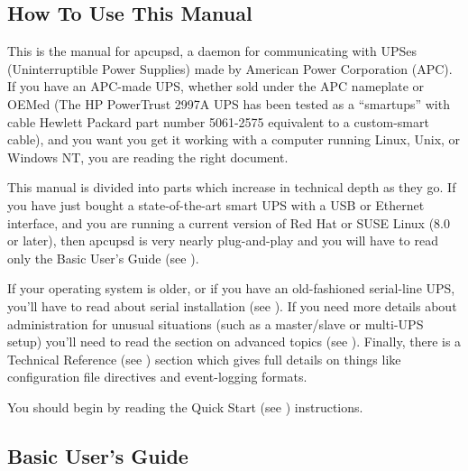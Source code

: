 \normalsize

\label{How-To-Use-This-Manual}

\subsection*{How To Use This Manual}

\label{index-Using-this-Manual-3}
This is the manual for apcupsd, a daemon for communicating with UPSes
(Uninterruptible Power Supplies) made by American Power Corporation (APC).  If
you have an APC-made UPS, whether sold under the APC nameplate or OEMed (The
HP PowerTrust 2997A UPS has been tested as a ``smartups'' with cable Hewlett
Packard part number 5061-2575 equivalent to a custom-smart cable), and you
want you get it working with a computer running Linux, Unix, or Windows NT,
you are reading the right document.  

This manual is divided into parts which increase in technical depth as they
go.  If you have just bought a state-of-the-art smart UPS with a USB or
Ethernet interface, and you are running a current version of Red Hat or SUSE
Linux (8.0 or later), then apcupsd is very nearly plug-and-play and you will
have to read only the Basic User's Guide (see 
).  

If your operating system is older, or if you have an old-fashioned serial-line
UPS, you'll have to read about serial installation (see 
).  If you need more
details about administration for unusual situations (such as a master/slave or
multi-UPS setup) you'll need to read the section on advanced topics (see 
). Finally, there is a
Technical Reference (see 
) section which
gives full details on things like configuration file directives and
event-logging formats.  

You should begin by reading the Quick Start (see 
)
instructions. 

\label{Basic-User_0027s-Guide}

\subsection*{Basic User's Guide}

